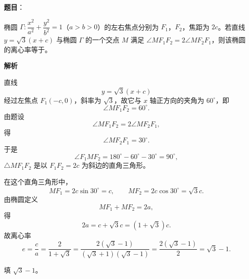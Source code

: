 \begin{answer}

\textbf{题目}：

椭圆 $\Gamma:\dfrac{x^2}{a^2}+\dfrac{y^2}{b^2}=1$（$a>b>0$）的左右焦点分别为 $F_1$，$F_2$，焦距为 $2c$。若直线 $y=\sqrt3(x+c)$ 与椭圆 $\Gamma$ 的一个交点 $M$ 满足 $\angle MF_1F_2=2\angle MF_2F_1$，则该椭圆的离心率等于\gkblank{}。

\textbf{解析}

直线
\nopagebreak[4]
\[y=\sqrt3(x+c)\]
经过左焦点 $F_1(-c,0)$，斜率为 $\sqrt3$，故它与 $x$ 轴正方向的夹角为 $60^\circ$，即
\nopagebreak[4]
\[\angle MF_1F_2=60^\circ.\]
由题设
\nopagebreak[4]
\[\angle MF_1F_2=2\angle MF_2F_1,\]
得
\nopagebreak[4]
\[\angle MF_2F_1=30^\circ.\]
于是
\nopagebreak[4]
\[\angle F_1MF_2=180^\circ-60^\circ-30^\circ=90^\circ,\]
$\triangle MF_1F_2$ 是以 $F_1F_2=2c$ 为斜边的直角三角形。

在这个直角三角形中，
\nopagebreak[4]
\[MF_1=2c\sin30^\circ=c,\qquad MF_2=2c\cos30^\circ=\sqrt3c.\]
由椭圆定义
\nopagebreak[4]
\[MF_1+MF_2=2a,\]
得
\nopagebreak[4]
\[2a=c+\sqrt3c=(1+\sqrt3)c.\]
故离心率
\nopagebreak[4]
\[e=\frac ca=\frac{2}{1+\sqrt3}=\frac{2(\sqrt3-1)}{(\sqrt3+1)(\sqrt3-1)}
=\frac{2(\sqrt3-1)}2=\sqrt3-1.\]

填 $\sqrt3-1$。


\end{answer}

